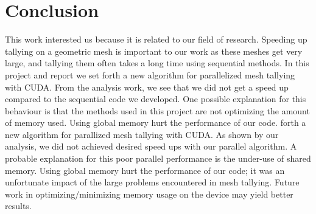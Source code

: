 \section{Conclusion}
This work interested us because it is related to our field of 
research. Speeding up tallying on a geometric mesh is important to our work 
as these meshes get very large, and tallying them often takes a long time
using sequential methods. In this project and report we set
forth a new algorithm for parallelized mesh tallying with CUDA. 
From the analysis work, we see that we did not get a speed up compared 
to the sequential code we developed. One possible explanation for this 
behaviour is that the methods used in this project are not optimizing 
the amount of memory used. Using global memory hurt the performance of our code.
forth a new algorithm for parallized mesh tallying with CUDA. 
As shown by our analysis, we did not achieved desired speed ups with our
parallel algorithm. 
A probable explanation for this poor parallel performance is the under-use of
shared memory. Using global memory hurt the performance of our code;
it was an unfortunate impact of the large problems encountered in mesh tallying.
Future work in optimizing/minimizing memory usage on the device may yield
better results.
